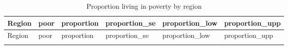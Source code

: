 \documentclass[
  english,
  12pt,
]{book}
\begin{document}
\begin{longtable}[]{@{}
  >{\raggedright\arraybackslash}p{}
  >{\centering\arraybackslash}p{}
  >{\centering\arraybackslash}p{}
  >{\centering\arraybackslash}p{}
  >{\centering\arraybackslash}p{}
  >{\centering\arraybackslash}p{}@{}}
\caption{\label{tab:tab-svyby-region-pobreza}Proportion living in poverty by region}\tabularnewline
\toprule\noalign{}
\begin{minipage}[b]{\linewidth}\raggedright
Region
\end{minipage} & \begin{minipage}[b]{\linewidth}\centering
poor
\end{minipage} & \begin{minipage}[b]{\linewidth}\centering
proportion
\end{minipage} & \begin{minipage}[b]{\linewidth}\centering
proportion\_se
\end{minipage} & \begin{minipage}[b]{\linewidth}\centering
proportion\_low
\end{minipage} & \begin{minipage}[b]{\linewidth}\centering
proportion\_upp
\end{minipage} \\
\midrule\noalign{}
\endfirsthead
\toprule\noalign{}
\begin{minipage}[b]{\linewidth}\raggedright
Region
\end{minipage} & \begin{minipage}[b]{\linewidth}\centering
poor
\end{minipage} & \begin{minipage}[b]{\linewidth}\centering
proportion
\end{minipage} & \begin{minipage}[b]{\linewidth}\centering
proportion\_se
\end{minipage} & \begin{minipage}[b]{\linewidth}\centering
proportion\_low
\end{minipage} & \begin{minipage}[b]{\linewidth}\centering
proportion\_upp
\end{minipage} \\
\midrule\noalign{}

\end{longtable}
\end{document}

